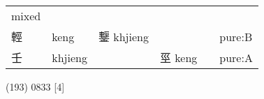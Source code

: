 \documentclass[14pt,a4paper]{scrartcl}
\begin{document}
\begin{longtable}[c]{@{}llllll@{}}
\begin{minipage}[t]{0.14\columnwidth}\raggedright\strut
mixed
\strut\end{minipage}\tabularnewline
\begin{minipage}[t]{0.14\columnwidth}\raggedright\strut
輕
\strut\end{minipage} &
\begin{minipage}[t]{0.14\columnwidth}\raggedright\strut
keng
\strut\end{minipage} &
\begin{minipage}[t]{0.14\columnwidth}\raggedright\strut
鑋 khjieng
\strut\end{minipage} &
\begin{minipage}[t]{0.14\columnwidth}\raggedright\strut
\strut\end{minipage} &
\begin{minipage}[t]{0.14\columnwidth}\raggedright\strut
\strut\end{minipage} &
\begin{minipage}[t]{0.14\columnwidth}\raggedright\strut
pure:B
\strut\end{minipage}\tabularnewline
\begin{minipage}[t]{0.14\columnwidth}\raggedright\strut
壬
\strut\end{minipage} &
\begin{minipage}[t]{0.14\columnwidth}\raggedright\strut
khjieng
\strut\end{minipage} &
\begin{minipage}[t]{0.14\columnwidth}\raggedright\strut
\strut\end{minipage} &
\begin{minipage}[t]{0.14\columnwidth}\raggedright\strut
巠 keng
\strut\end{minipage} &
\begin{minipage}[t]{0.14\columnwidth}\raggedright\strut
\strut\end{minipage} &
\begin{minipage}[t]{0.14\columnwidth}\raggedright\strut
pure:A
\strut\end{minipage}\tabularnewline
\bottomrule
\end{longtable}

(193) 0833 {[}4{]}
\end{document}
